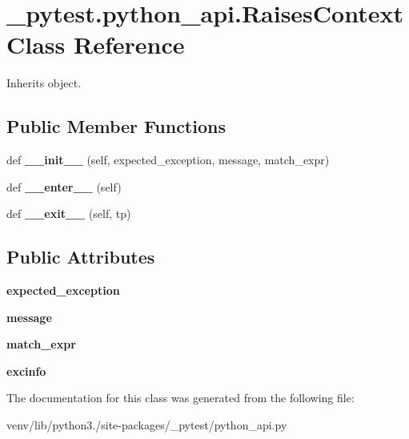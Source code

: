 \hypertarget{class__pytest_1_1python__api_1_1_raises_context}{}\section{\+\_\+pytest.\+python\+\_\+api.\+Raises\+Context Class Reference}
\label{class__pytest_1_1python__api_1_1_raises_context}


Inherits object.

\subsection*{Public Member Functions}
\begin{DoxyCompactItemize}
\item 
\mbox{\label{class__pytest_1_1python__api_1_1_raises_context_af008aa3270d08834d60a400d0eb100cf}} 
def {\bfseries \+\_\+\+\_\+init\+\_\+\+\_\+} (self, expected\+\_\+exception, message, match\+\_\+expr)
\item 
\mbox{\label{class__pytest_1_1python__api_1_1_raises_context_aca75c8d18cbddc894637ecc6c6278f14}} 
def {\bfseries \+\_\+\+\_\+enter\+\_\+\+\_\+} (self)
\item 
\mbox{\label{class__pytest_1_1python__api_1_1_raises_context_acdaecb7bb097c22305e4d5a8a67284ca}} 
def {\bfseries \+\_\+\+\_\+exit\+\_\+\+\_\+} (self, tp)
\end{DoxyCompactItemize}
\subsection*{Public Attributes}
\begin{DoxyCompactItemize}
\item 
\mbox{\label{class__pytest_1_1python__api_1_1_raises_context_a9b1118c63b166d4159c7dd9bb93b920e}} 
{\bfseries expected\+\_\+exception}
\item 
\mbox{\label{class__pytest_1_1python__api_1_1_raises_context_adef95177e3644ce7543279fe76e27c2a}} 
{\bfseries message}
\item 
\mbox{\label{class__pytest_1_1python__api_1_1_raises_context_ae49b6e488de82c33139a1fa483696eb7}} 
{\bfseries match\+\_\+expr}
\item 
\mbox{\label{class__pytest_1_1python__api_1_1_raises_context_af686132b40b61ae907d2c64c009893a9}} 
{\bfseries excinfo}
\end{DoxyCompactItemize}


The documentation for this class was generated from the following file\+:\begin{DoxyCompactItemize}
\item 
venv/lib/python3./site-\/packages/\+\_\+pytest/python\+\_\+api.\+py\end{DoxyCompactItemize}

